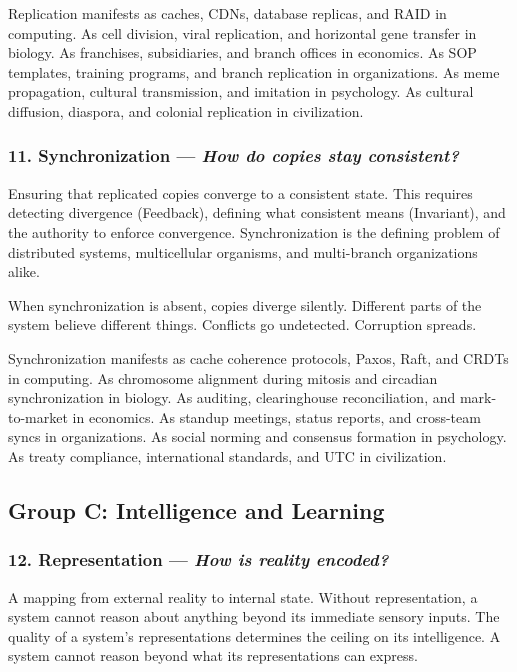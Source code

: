 \documentclass[11pt,a4paper]{article}
\newcommand{\question}[1]{\textit{#1}}
\begin{document}
Replication manifests as caches, CDNs, database replicas, and RAID in computing. As cell division, viral replication, and horizontal gene transfer in biology. As franchises, subsidiaries, and branch offices in economics. As SOP templates, training programs, and branch replication in organizations. As meme propagation, cultural transmission, and imitation in psychology. As cultural diffusion, diaspora, and colonial replication in civilization.

\subsubsection{11. Synchronization --- \question{How do copies stay consistent?}}

Ensuring that replicated copies converge to a consistent state. This requires detecting divergence (Feedback), defining what consistent means (Invariant), and the authority to enforce convergence. Synchronization is the defining problem of distributed systems, multicellular organisms, and multi-branch organizations alike.

When synchronization is absent, copies diverge silently. Different parts of the system believe different things. Conflicts go undetected. Corruption spreads.

Synchronization manifests as cache coherence protocols, Paxos, Raft, and CRDTs in computing. As chromosome alignment during mitosis and circadian synchronization in biology. As auditing, clearinghouse reconciliation, and mark-to-market in economics. As standup meetings, status reports, and cross-team syncs in organizations. As social norming and consensus formation in psychology. As treaty compliance, international standards, and UTC in civilization.

\subsection{Group C: Intelligence and Learning}

\subsubsection{12. Representation --- \question{How is reality encoded?}}

A mapping from external reality to internal state. Without representation, a system cannot reason about anything beyond its immediate sensory inputs. The quality of a system's representations determines the ceiling on its intelligence. A system cannot reason beyond what its representations can express.
\end{document}
